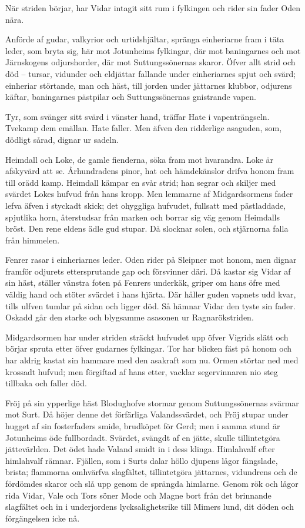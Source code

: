 När striden börjar, har Vidar intagit sitt rum i fylkingen och rider sin
fader Oden nära.

Anförde af gudar, valkyrior och urtidshjältar, spränga einheriarne fram
i täta leder, som bryta sig, här mot Jotunheims fylkingar, där mot
baningarnes och mot Järnskogens odjurshorder, där mot Suttungssönernas
skaror. Öfver allt strid och död -- tursar, vidunder och eldjättar
fallande under einheriarnes spjut och svärd; einheriar störtande, man
och häst, till jorden under jättarnes klubbor, odjurens käftar,
baningarnes pästpilar och Suttungssönernas gnistrande vapen.

Tyr, som svänger sitt svärd i vänster hand, träffar Hate i
vapenträngseln. Tvekamp dem emällan. Hate faller. Men äfven den
ridderlige asaguden, som, dödligt sårad, dignar ur sadeln.

Heimdall och Loke, de gamle fienderna, söka fram mot hvarandra. Loke är
afskyvärd att se. Århundradens pinor, hat och hämdekänslor drifva honom
fram till orädd kamp. Heimdall kämpar en svår strid; han segrar och
skiljer med svärdet Lokes hufvud från hans kropp. Men lemmarne af
Midgardsormens fader lefva äfven i styckadt skick; det ohyggliga
hufvudet, fullsatt med pästladdade, spjutlika horn, återstudsar från
marken och borrar sig väg genom Heimdalls bröst. Den rene eldens ädle
gud stupar. Då slocknar solen, och stjärnorna falla från himmelen.

Fenrer rasar i einheriarnes leder. Oden rider på Sleipner mot honom, men
dignar framför odjurets ettersprutande gap och försvinner däri. Då
kastar sig Vidar af sin häst, ställer vänstra foten på Fenrers underkäk,
griper om hans
öfre med väldig hand och stöter svärdet i hans hjärta. Där håller guden
vapnets udd kvar, tills ulfven tumlar på sidan och ligger död. Så hämnar
Vidar den tyste sin fader. Oskadd går den starke och blygsamme asasonen
ur Ragnarökstriden.

Midgardsormen har under striden sträckt hufvudet upp öfver Vigrids slätt
och börjar spruta etter öfver gudarnes fylkingar. Tor har blicken fäst
på honom och har aldrig kastat sin hammare med den asakraft som nu.
Ormen störtar ned med krossadt hufvud; men förgiftad af hans etter,
vacklar segervinnaren nio steg tillbaka och faller död.

Fröj på sin ypperlige häst Blodughofve stormar genom Suttungssönernas
svärmar mot Surt. Då höjer denne det förfärliga Valandssvärdet, och Fröj
stupar under hugget af sin fosterfaders smide, brudköpet för Gerd; men i
samma stund är Jotunheims öde fullbordadt. Svärdet, svängdt af en jätte,
skulle tillintetgöra jättevärlden. Det ödet hade Valand smidt in i dess
klinga. Himlahvalf efter himlahvalf rämnar. Fjällen, som i Surts dalar
höllo djupens lågor fängslade, brista; flammorna omhvärfva slagfältet,
tillintetgöra jättarnes, vidundrens och de fördömdes skaror och slå upp
genom de sprängda himlarne. Genom rök och lågor rida Vidar, Vale och
Tors söner Mode och Magne bort från det brinnande slagfältet och in i
underjordens lycksalighetsrike till Mimers lund, dit döden och
förgängelsen icke nå.

